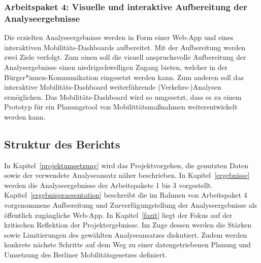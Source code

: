 \subsubsection{Arbeitspaket 4: Visuelle und interaktive Aufbereitung der Analyseergebnisse}

Die erzielten Analyseergebnisse werden in Form einer Web-App und eines interaktiven Mobilitäts-Dashboards aufbereitet. Mit der Aufbereitung werden zwei Ziele verfolgt. Zum einen soll die visuell anspruchsvolle Aufbereitung der Analysergebnisse einen niedrigschwelligen Zugang bieten, welcher in der Bürger*innen-Kommunikation eingesetzt werden kann. Zum anderen soll das interaktive Mobilitäts-Dashboard weiterführende (Verkehrs-)Analysen ermöglichen. Das Mobilitäts-Dashboard wird so umgesetzt, dass es zu einem Prototyp für ein Planungstool von Mobilittätsmaßnahmen weiterentwickelt werden kann.

\subsection{Struktur des Berichts}
In Kapitel~\ref{projektumsetzung} wird das Projektvorgehen, die genutzten Daten sowie der verwendete Analyseansatz näher beschrieben. In Kapitel~\ref{ergebnisse} werden die Analyseergebnisse der Arbeitspakete 1 bis 3 vorgestellt. Kapitel~\ref{ergebnispraesentation} beschreibt die im Rahmen von Arbeitspaket 4 vorgenommene Aufbereitung und Zurverfügungstellung der Analyseergebnisse als öffentlich zugängliche Web-App. In Kapitel~\ref{fazit} liegt der Fokus auf der kritischen Reflektion der Projektergebnisse. Im Zuge dessen werden die Stärken sowie Limitierungen des gewählten Analyseansatzes diskutiert. Zudem werden konkrete nächste Schritte auf dem Weg zu einer datengetriebenen Planung und Umsetzung des Berliner Mobilitätsgesetzes definiert.

